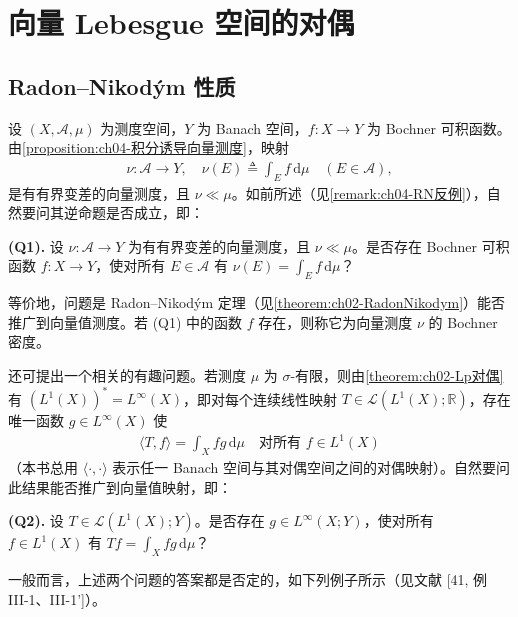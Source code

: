 \documentclass[../../main.tex]{subfiles}%
\begin{document}
\section{向量 Lebesgue 空间的对偶}\label{section:ch04-对偶}

\subsection{Radon--Nikodým 性质}\label{subsection:ch04-RNP}

设 $(X,\mathcal{A},\mu)$ 为测度空间，$Y$ 为 Banach 空间，$f:X\to Y$ 为 Bochner 可积函数。由\cref{proposition:ch04-积分诱导向量测度}，映射
\begin{align*}
\nu:\mathcal{A}\to Y,\quad \nu(E)\triangleq \int_E f\,\mathrm{d}\mu\quad(E\in\mathcal{A}),
\end{align*}
是有有界变差的向量测度，且 $\nu\ll\mu$。如前所述（见\cref{remark:ch04-RN反例}），自然要问其逆命题是否成立，即：

\noindent\textbf{(Q1).} 设 $\nu:\mathcal{A}\to Y$ 为有有界变差的向量测度，且 $\nu\ll\mu$。是否存在 Bochner 可积函数 $f:X\to Y$，使对所有 $E\in\mathcal{A}$ 有 $\nu(E)=\int_E f\,\mathrm{d}\mu$？

等价地，问题是 Radon--Nikodým 定理（见\cref{theorem:ch02-RadonNikodym}）能否推广到向量值测度。若 (Q1) 中的函数 $f$ 存在，则称它为向量测度 $\nu$ 的 Bochner 密度。

还可提出一个相关的有趣问题。若测度 $\mu$ 为 $\sigma$-有限，则由\cref{theorem:ch02-Lp对偶}有 $(L^1(X))^*=L^\infty(X)$，即对每个连续线性映射 $T\in\mathcal{L}(L^1(X);\mathbb{R})$，存在唯一函数 $g\in L^\infty(X)$ 使
\begin{align*}
\langle T,f\rangle=\int_X fg\,\mathrm{d}\mu\quad\text{对所有 }f\in L^1(X)
\end{align*}
（本书总用 $\langle\cdot,\cdot\rangle$ 表示任一 Banach 空间与其对偶空间之间的对偶映射）。自然要问此结果能否推广到向量值映射，即：

\noindent\textbf{(Q2).} 设 $T\in\mathcal{L}(L^1(X);Y)$。是否存在 $g\in L^\infty(X;Y)$，使对所有 $f\in L^1(X)$ 有 $Tf=\int_X fg\,\mathrm{d}\mu$？

一般而言，上述两个问题的答案都是否定的，如下列例子所示（见文献 [41, 例 III-1、III-1']）。
\end{document}
